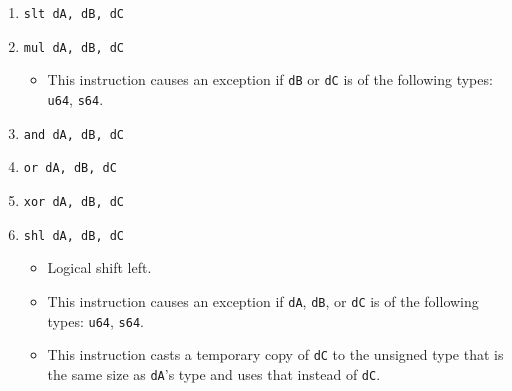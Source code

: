 \documentclass{article}
\begin{document}
\begin{itemize}
\begin{enumerate}
			\item \texttt{slt dA, dB, dC}
			\item \texttt{mul dA, dB, dC}
				\begin{itemize}
				\item This instruction causes an exception if \texttt{dB}
					or \texttt{dC} is of the following types: \texttt{u64},
					\texttt{s64}.
				\end{itemize}

			\item \texttt{and dA, dB, dC}
			\item \texttt{or dA, dB, dC}
			\item \texttt{xor dA, dB, dC}
			\item \texttt{shl dA, dB, dC}
				\begin{itemize}
				\item Logical shift left.
				\item This instruction causes an exception if \texttt{dA},
					\texttt{dB}, or \texttt{dC} is of the following types:
					\texttt{u64}, \texttt{s64}.
				\item This instruction casts a temporary copy of
					\texttt{dC} to the unsigned type that is the same size
					as \texttt{dA}'s type and uses that instead of
					\texttt{dC}.
				\end{itemize}


\end{enumerate}
\end{itemize}
\end{document}
